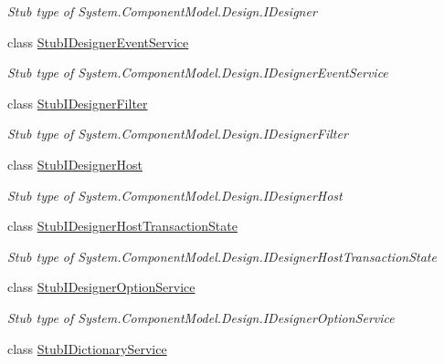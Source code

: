 \begin{DoxyCompactItemize}
\begin{DoxyCompactList}\small\item\em Stub type of System.\-Component\-Model.\-Design.\-I\-Designer\end{DoxyCompactList}\item 
class \hyperlink{class_system_1_1_component_model_1_1_design_1_1_fakes_1_1_stub_i_designer_event_service}{Stub\-I\-Designer\-Event\-Service}
\begin{DoxyCompactList}\small\item\em Stub type of System.\-Component\-Model.\-Design.\-I\-Designer\-Event\-Service\end{DoxyCompactList}\item 
class \hyperlink{class_system_1_1_component_model_1_1_design_1_1_fakes_1_1_stub_i_designer_filter}{Stub\-I\-Designer\-Filter}
\begin{DoxyCompactList}\small\item\em Stub type of System.\-Component\-Model.\-Design.\-I\-Designer\-Filter\end{DoxyCompactList}\item 
class \hyperlink{class_system_1_1_component_model_1_1_design_1_1_fakes_1_1_stub_i_designer_host}{Stub\-I\-Designer\-Host}
\begin{DoxyCompactList}\small\item\em Stub type of System.\-Component\-Model.\-Design.\-I\-Designer\-Host\end{DoxyCompactList}\item 
class \hyperlink{class_system_1_1_component_model_1_1_design_1_1_fakes_1_1_stub_i_designer_host_transaction_state}{Stub\-I\-Designer\-Host\-Transaction\-State}
\begin{DoxyCompactList}\small\item\em Stub type of System.\-Component\-Model.\-Design.\-I\-Designer\-Host\-Transaction\-State\end{DoxyCompactList}\item 
class \hyperlink{class_system_1_1_component_model_1_1_design_1_1_fakes_1_1_stub_i_designer_option_service}{Stub\-I\-Designer\-Option\-Service}
\begin{DoxyCompactList}\small\item\em Stub type of System.\-Component\-Model.\-Design.\-I\-Designer\-Option\-Service\end{DoxyCompactList}\item 
class \hyperlink{class_system_1_1_component_model_1_1_design_1_1_fakes_1_1_stub_i_dictionary_service}{Stub\-I\-Dictionary\-Service}

\end{DoxyCompactItemize}
